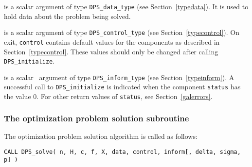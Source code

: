 \documentclass{galahad}
\newcommand{\packagename}{DPS}
\begin{document}
\begin{description}

 is a scalar \intentinout argument of type
{\tt \packagename\_data\_type}
(see Section~\ref{typedata}). It is used to hold data about the problem being
solved.

 is a scalar \intentout argument of type
{\tt \packagename\_control\_type}
(see Section~\ref{typecontrol}).
On exit, {\tt control} contains default values for the components as
described in Section~\ref{typecontrol}.
These values should only be changed after calling
{\tt \packagename\_initialize}.

 is a scalar \intentout\ argument of type
{\tt \packagename\_inform\_type}
(see Section~\ref{typeinform}). A successful call to
{\tt \packagename\_initialize}
is indicated when the  component {\tt status} has the value 0.
For other return values of {\tt status}, see Section~\ref{galerrors}.

\end{description}


\subsubsection{The optimization problem solution subroutine}
The optimization problem solution algorithm is called as follows:

\hskip0.5in
{\tt CALL \packagename\_solve( n, H, c, f, X, data, control, inform[, delta, sigma, p] )}
\end{document}
